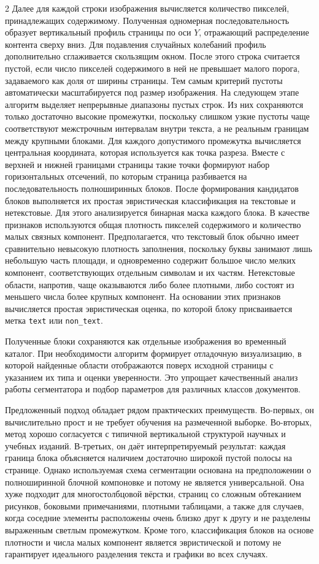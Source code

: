 \documentclass[11pt]{article}
\begin{document}
\begin{multicols}{2}
Далее для каждой строки изображения вычисляется количество пикселей, принадлежащих содержимому. Полученная одномерная последовательность образует вертикальный профиль страницы по оси $Y$, отражающий распределение контента сверху вниз. Для подавления случайных колебаний профиль дополнительно сглаживается скользящим окном. После этого строка считается пустой, если число пикселей содержимого в ней не превышает малого порога, задаваемого как доля от ширины страницы. Тем самым критерий пустоты автоматически масштабируется под размер изображения.
На следующем этапе алгоритм выделяет непрерывные диапазоны пустых строк. Из них сохраняются только достаточно высокие промежутки, поскольку слишком узкие пустоты чаще соответствуют межстрочным интервалам внутри текста, а не реальным границам между крупными блоками. Для каждого допустимого промежутка вычисляется центральная координата, которая используется как точка разреза. Вместе с верхней и нижней границами страницы такие точки формируют набор горизонтальных отсечений, по которым страница разбивается на последовательность полноширинных блоков.
После формирования кандидатов блоков выполняется их простая эвристическая классификация на текстовые и нетекстовые. Для этого анализируется бинарная маска каждого блока. В качестве признаков используются общая плотность пикселей содержимого и количество малых связных компонент. Предполагается, что текстовый блок обычно имеет сравнительно невысокую плотность заполнения, поскольку буквы занимают лишь небольшую часть площади, и одновременно содержит большое число мелких компонент, соответствующих отдельным символам и их частям. Нетекстовые области, напротив, чаще оказываются либо более плотными, либо состоят из меньшего числа более крупных компонент. На основании этих признаков вычисляется простая эвристическая оценка, по которой блоку присваивается метка \texttt{text} или \texttt{non\_text}.

Полученные блоки сохраняются как отдельные изображения во временный каталог. При необходимости алгоритм формирует отладочную визуализацию, в которой найденные области отображаются поверх исходной страницы с указанием их типа и оценки уверенности. Это упрощает качественный анализ работы сегментатора и подбор параметров для различных классов документов.

Предложенный подход обладает рядом практических преимуществ. Во-первых, он вычислительно прост и не требует обучения на размеченной выборке. Во-вторых, метод хорошо согласуется с типичной вертикальной структурой научных и учебных изданий. В-третьих, он даёт интерпретируемый результат: каждая граница блока объясняется наличием достаточно широкой пустой полосы на странице.
Однако используемая схема сегментации основана на предположении о полноширинной блочной компоновке и потому не является универсальной. Она хуже подходит для многостолбцовой вёрстки, страниц со сложным обтеканием рисунков, боковыми примечаниями, плотными таблицами, а также для случаев, когда соседние элементы расположены очень близко друг к другу и не разделены выраженным светлым промежутком. Кроме того, классификация блоков на основе плотности и числа малых компонент является эвристической и потому не гарантирует идеального разделения текста и графики во всех случаях.


\end{multicols}
\end{document}
